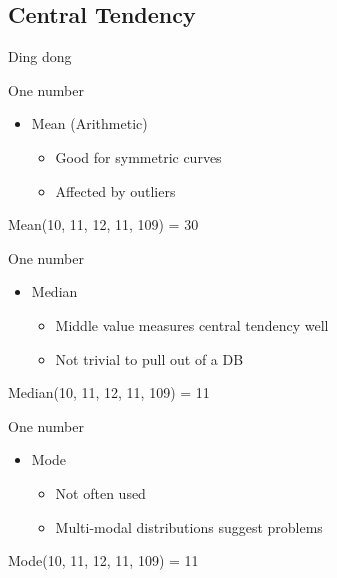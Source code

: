 \documentclass{beamer}
\begin{document}
\subsection{Central Tendency}

\begin{frame}{Ding dong}
\end{frame}

\begin{frame}{One number}
  \begin{itemize}
  \item Mean (Arithmetic)
    \begin{itemize}
    \item Good for symmetric curves
    \item Affected by outliers
    \end{itemize}
  \end{itemize}
  \begin{center}
  \Large{ Mean(10, 11, 12, 11, 109) = 30 }
  \end{center}
\end{frame}

\begin{frame}{One number}
  \begin{itemize}
  \item Median
    \begin{itemize}
    \item Middle value measures central tendency well
    \item Not trivial to pull out of a DB
    \end{itemize}
  \end{itemize}
  \begin{center}
  \Large{ Median(10, 11, 12, 11, 109) = 11 }
  \end{center}
\end{frame}

\begin{frame}{One number}
  \begin{itemize}
  \item Mode
    \begin{itemize}
    \item Not often used
    \item Multi-modal distributions suggest problems
    \end{itemize}
  \end{itemize}
  \begin{center}
  \Large{ Mode(10, 11, 12, 11, 109) = 11 }
  \end{center}
\end{frame}
\end{document}
